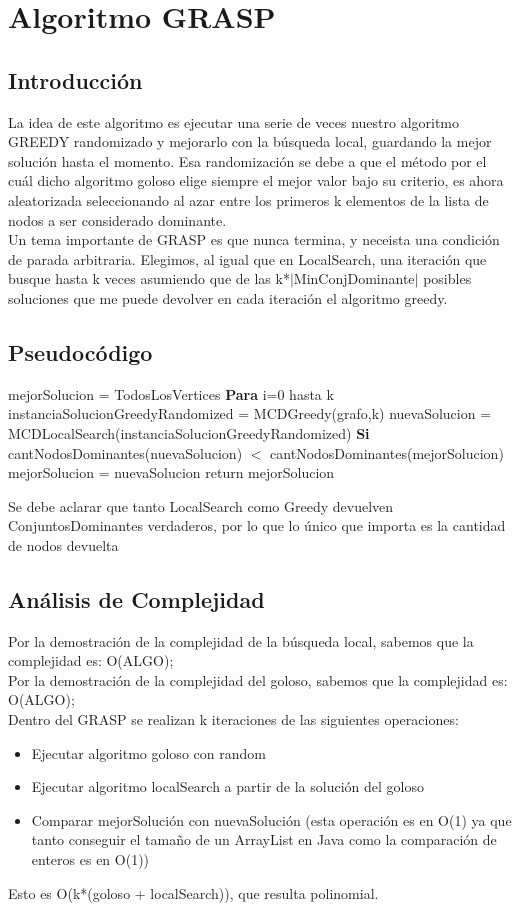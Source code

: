 \section{Algoritmo GRASP}

\subsection{Introducción}
La idea de este algoritmo es ejecutar una serie de veces nuestro algoritmo GREEDY randomizado y mejorarlo con la búsqueda local, guardando la mejor solución hasta el momento.
Esa randomización se debe a que el método por el cuál dicho algoritmo goloso elige siempre el mejor valor bajo su criterio, es ahora aleatorizada seleccionando al azar entre los primeros k elementos de la
lista de nodos a ser considerado dominante.\\
Un tema importante de GRASP es que nunca termina, y neceista una condición de parada arbitraria. Elegimos, al igual que en LocalSearch, una iteración que busque hasta k veces asumiendo que
de las k*$|$MinConjDominante$|$ posibles soluciones que me puede devolver en cada iteración el algoritmo greedy.

\subsection{Pseudocódigo}

\begin{codebox}
\li	mejorSolucion = TodosLosVertices
\li \textbf{Para} i=0 hasta k \Do
\li 	instanciaSolucionGreedyRandomized = MCDGreedy(grafo,k)
\li	nuevaSolucion = MCDLocalSearch(instanciaSolucionGreedyRandomized)
\li 	\textbf{Si} cantNodosDominantes(nuevaSolucion) $<$ cantNodosDominantes(mejorSolucion)  \Do
\li		mejorSolucion = nuevaSolucion
	\End
    \End	
\li	return mejorSolucion	
\end{codebox}
Se debe aclarar que tanto LocalSearch como Greedy devuelven ConjuntosDominantes verdaderos, por lo que lo único que importa es la cantidad de nodos devuelta

\subsection{Análisis de Complejidad}
Por la demostración de la complejidad de la búsqueda local, sabemos que la complejidad es: O(ALGO);\\
Por la demostración de la complejidad del goloso, sabemos que la complejidad es: O(ALGO);\\
Dentro del GRASP se realizan k iteraciones de las siguientes operaciones:
\begin{itemize}
\item Ejecutar algoritmo goloso con random
\item Ejecutar algoritmo localSearch a partir de la solución del goloso
\item Comparar mejorSolución con nuevaSolución (esta operación es en O(1) ya que tanto conseguir el tamaño de un ArrayList en Java como la comparación de enteros es en O(1)) 
\end{itemize}
Esto es O(k*(goloso + localSearch)), que resulta polinomial.

